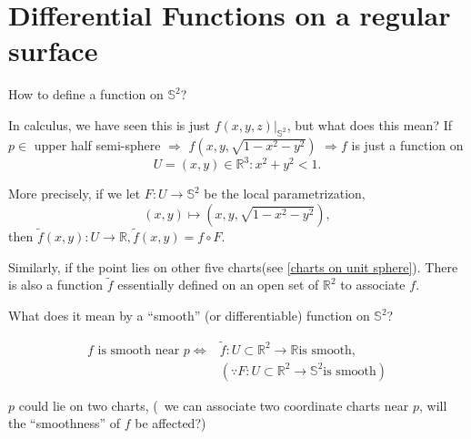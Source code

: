 \section{Differential Functions on a regular surface}
\begin{question}[1]
    How to define a function on $\mathbb{S}^2$?
\end{question}
In calculus, we have seen this is just $f\left(x,y,z
    \right)|_{\mathbb{S}^2}$, but what does this mean?
If $p\in $ upper half semi-sphere $\Rightarrow$ $f\left(x,y,\sqrt{1-x^2-y^2}\right)$ $\Rightarrow f$ is just a function on
\[
    U={(x,y)\in \mathbb{R}^3\colon x^2+y^2<1}  .
\]

More precisely, if we let $F\colon U\to \mathbb{S}^2$ be the local parametrization,
\[
    (x,y)\mapsto (x,y,\sqrt{1-x^2-y^2}),
\]
then $\tilde{f}(x,y)\colon U\to \mathbb{R}, \tilde{f}(x,y)=f\circ  F$.

Similarly, if the point lies on other five charts(see \cref{charts on unit sphere}). There is also a function $\tilde{f}$ essentially defined on an open set of $\mathbb{R}^2$ to associate $f$.

\begin{question}[2]
    What does it mean by a ``smooth'' (or differentiable) function on $\mathbb{S}^2$?
\end{question}
\begin{align*}
    f \text{ is smooth near }p \Leftrightarrow &
    \tilde{f}\colon U\subset \mathbb{R}^2 \to \mathbb{R} \text{is smooth,}                                                 \\
                                               & (\because F\colon U\subset \mathbb{R}^2\to \mathbb{S}^2 \text{is smooth})
\end{align*}
\begin{question}[3]
    $p$ could lie on two charts, (\ie\ we can associate two coordinate charts near $p$, will the ``smoothness'' of $f$ be affected?)
\end{question}


